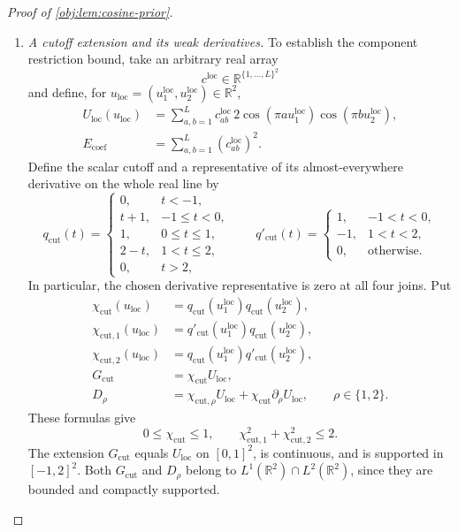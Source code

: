 \begin{proof}[Proof of \cref{obj:lem:cosine-prior}]
\begin{enumerate}
\item \emph{A cutoff extension and its weak derivatives.}
To establish the component restriction bound, take an arbitrary real array
\[
c^{\mathrm{loc}}\in\mathbb R^{\{1,\ldots,L\}^2}
\]
and define, for
\(u_{\mathrm{loc}}=(u_1^{\mathrm{loc}},u_2^{\mathrm{loc}})\in\mathbb R^2\),
\[
\begin{aligned}
U_{\mathrm{loc}}(u_{\mathrm{loc}})
&=\sum_{a,b=1}^L c^{\mathrm{loc}}_{ab}
  \,2\cos(\pi a u_1^{\mathrm{loc}})
     \cos(\pi b u_2^{\mathrm{loc}}),\\
E_{\mathrm{coef}}
&=\sum_{a,b=1}^L(c^{\mathrm{loc}}_{ab})^2.
\end{aligned}
\]
Define the scalar cutoff and a representative of its almost-everywhere
derivative on the whole real line by
\[
q_{\mathrm{cut}}(t)=
\begin{cases}
0,&t<-1,\\
t+1,&-1\leq t<0,\\
1,&0\leq t\leq1,\\
2-t,&1<t\leq2,\\
0,&t>2,
\end{cases}
\qquad
q'_{\mathrm{cut}}(t)=
\begin{cases}
1,&-1<t<0,\\
-1,&1<t<2,\\
0,&\text{otherwise}.
\end{cases}
\]
In particular, the chosen derivative representative is zero at all four
joins. Put
\[
\begin{aligned}
\chi_{\mathrm{cut}}(u_{\mathrm{loc}})
&=q_{\mathrm{cut}}(u_1^{\mathrm{loc}})
  q_{\mathrm{cut}}(u_2^{\mathrm{loc}}),\\
\chi_{\mathrm{cut},1}(u_{\mathrm{loc}})
&=q'_{\mathrm{cut}}(u_1^{\mathrm{loc}})
  q_{\mathrm{cut}}(u_2^{\mathrm{loc}}),\\
\chi_{\mathrm{cut},2}(u_{\mathrm{loc}})
&=q_{\mathrm{cut}}(u_1^{\mathrm{loc}})
  q'_{\mathrm{cut}}(u_2^{\mathrm{loc}}),\\
G_{\mathrm{cut}}&=\chi_{\mathrm{cut}}U_{\mathrm{loc}},\\
D_\rho
&=\chi_{\mathrm{cut},\rho}U_{\mathrm{loc}}
  +\chi_{\mathrm{cut}}\partial_\rho U_{\mathrm{loc}},
  \qquad \rho\in\{1,2\}.
\end{aligned}
\]
These formulas give
\[
0\leq\chi_{\mathrm{cut}}\leq1,
\qquad
\chi_{\mathrm{cut},1}^2+\chi_{\mathrm{cut},2}^2\leq2.
\]
The extension \(G_{\mathrm{cut}}\) equals \(U_{\mathrm{loc}}\) on
\([0,1]^2\), is continuous, and is supported in \([-1,2]^2\).
Both \(G_{\mathrm{cut}}\) and \(D_\rho\) belong to
\(L^1(\mathbb R^2)\cap L^2(\mathbb R^2)\), since they are bounded and
compactly supported.


\end{enumerate}
\end{proof}
